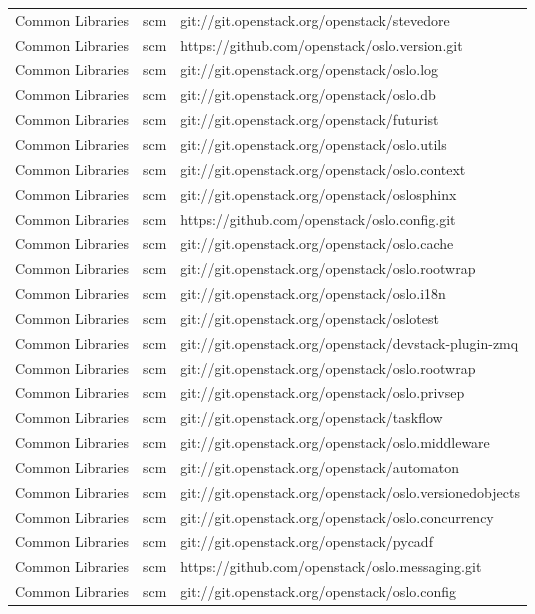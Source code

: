 \begin{center}
\begin{longtable}{|p{4cm}|p{1cm}|p{10cm}|}
Common Libraries&scm&git://git.openstack.org/openstack/stevedore\\ 
Common Libraries&scm&https://github.com/openstack/oslo.version.git\\ 
Common Libraries&scm&git://git.openstack.org/openstack/oslo.log\\ 
Common Libraries&scm&git://git.openstack.org/openstack/oslo.db\\ 
Common Libraries&scm&git://git.openstack.org/openstack/futurist\\ 
Common Libraries&scm&git://git.openstack.org/openstack/oslo.utils\\ 
Common Libraries&scm&git://git.openstack.org/openstack/oslo.context\\ 
Common Libraries&scm&git://git.openstack.org/openstack/oslosphinx\\ 
Common Libraries&scm&https://github.com/openstack/oslo.config.git\\ 
Common Libraries&scm&git://git.openstack.org/openstack/oslo.cache\\ 
Common Libraries&scm&git://git.openstack.org/openstack/oslo.rootwrap\\ 
Common Libraries&scm&git://git.openstack.org/openstack/oslo.i18n\\ 
Common Libraries&scm&git://git.openstack.org/openstack/oslotest\\ 
Common Libraries&scm&git://git.openstack.org/openstack/devstack-plugin-zmq\\ 
Common Libraries&scm&git://git.openstack.org/openstack/oslo.rootwrap\\ 
Common Libraries&scm&git://git.openstack.org/openstack/oslo.privsep\\ 
Common Libraries&scm&git://git.openstack.org/openstack/taskflow\\ 
Common Libraries&scm&git://git.openstack.org/openstack/oslo.middleware\\ 
Common Libraries&scm&git://git.openstack.org/openstack/automaton\\ 
Common Libraries&scm&git://git.openstack.org/openstack/oslo.versionedobjects\\ 
Common Libraries&scm&git://git.openstack.org/openstack/oslo.concurrency\\ 
Common Libraries&scm&git://git.openstack.org/openstack/pycadf\\ 
Common Libraries&scm&https://github.com/openstack/oslo.messaging.git\\ 
Common Libraries&scm&git://git.openstack.org/openstack/oslo.config\\ 

\end{longtable}
\end{center}
